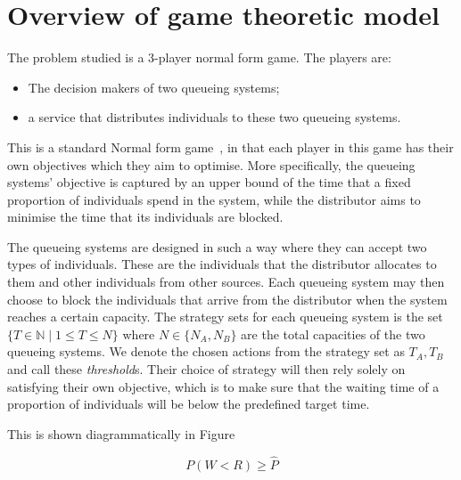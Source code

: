 \section{Overview of game theoretic model}

The problem studied is a 3-player normal form game. The players are:
  
\begin{itemize}
    \item The decision makers of two queueing systems;
    \item a service that distributes individuals to these two queueing systems.
\end{itemize}

This is a standard Normal form game~\cite{Maschler2013},  
in that each player in this game has their own objectives which they aim to 
optimise.
More specifically, the queueing systems' objective is captured by an upper bound
of the time that a fixed proportion of individuals spend in the system, 
while the distributor aims to minimise the time that its individuals 
are blocked.   

The queueing systems are designed in such a way where they can accept two types
of individuals. 
These are the individuals that the distributor allocates to them and 
other individuals from other sources. 
Each queueing system may then choose to block the individuals that arrive from 
the distributor when the system reaches a certain capacity. 
The strategy sets for each queueing system is the set 
\( \{T \in \mathbb{N} \;|\; 1 \leq T \leq N\} \) where \(N \in\{N_A, N_B\}\) are 
the total capacities of the two queueing systems. We denote the chosen actions 
from the strategy set as \(T_A, T_B\) and call these \textit{threshold}s.
Their choice of strategy will then rely solely on satisfying their own 
objective, which is to make sure that the waiting time of a proportion of 
individuals will be below the predefined target time.

This is shown diagrammatically in Figure %


\begin{equation}
    P(W < R) \geq \hat{P}
\end{equation}

